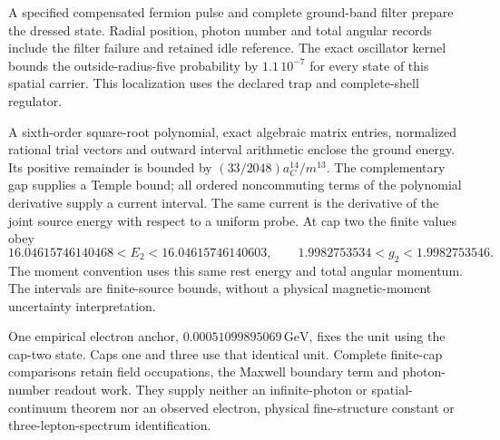 A specified compensated fermion pulse and complete ground-band filter
prepare the dressed state. Radial position, photon number and total angular
records include the filter failure and retained idle reference. The exact
oscillator kernel bounds the outside-radius-five probability by
$1.1\,10^{-7}$ for every state of this spatial carrier. This localization
uses the declared trap and complete-shell regulator.

A sixth-order square-root polynomial, exact algebraic matrix entries,
normalized rational trial vectors and outward interval arithmetic enclose
the ground energy. Its positive remainder is bounded by
$(33/2048)a_C^{14}/m^{13}$. The complementary gap supplies a Temple bound;
all ordered noncommuting terms of the polynomial derivative supply a
current interval. The same current is the derivative of the joint source
energy with respect to a uniform probe. At cap two the finite values obey
\[
 16.04615746140468<E_2<16.04615746140603,\qquad
 1.9982753534<g_2<1.9982753546.
\]
The moment convention uses this same rest energy and total angular
momentum. The intervals are finite-source bounds, without a physical
magnetic-moment uncertainty interpretation.

One empirical electron anchor, $0.00051099895069\,\mathrm{GeV}$, fixes the
unit using the cap-two state. Caps one and three use that identical unit.
Complete finite-cap comparisons retain field occupations, the Maxwell
boundary term and photon-number readout work. They supply neither an
infinite-photon or spatial-continuum theorem nor an observed electron,
physical fine-structure constant or three-lepton-spectrum identification.
